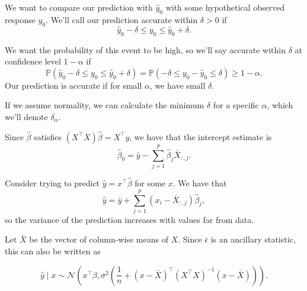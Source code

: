 \documentclass[letterpaper,11pt]{article}
\begin{document}
\begin{enumerate}
\begin{enumerate}
\begin{enumerate}
\begin{description}
        We want to compare our prediction with $\hat{y}_0$ with some
        hypothetical observed response $y_0$. We'll call our prediction
        accurate within $\delta > 0$ if
        \begin{equation*}
          \hat{y}_0 - \delta \leq y_0 \leq \hat{y}_0 + \delta.
        \end{equation*}

        We want the probability of this event to be high, so we'll say accurate
        within $\delta$ at confidence level $1 - \alpha$ if
        \begin{equation*}
          \mathbb{P}\left(\hat{y}_0 - \delta \leq y_0 \leq \hat{y}_0 + \delta\right)
          = \mathbb{P}\left(-\delta \leq y_0 - \hat{y}_0 \leq \delta\right)
          \geq 1 - \alpha.
        \end{equation*}
        Our prediction is accurate if for small $\alpha$, we have small
        $\delta$.

        If we assume normality, we can calculate the minimum $\delta$ for a
        specific $\alpha$, which we'll denote $\delta_\alpha$.

        Since $\hat{\beta}$ satisfies
        $\left(X^\intercal X\right)\hat{\beta} = X^\intercal y$, we have that
        the intercept estimate is
        \begin{equation}
          \hat{\beta}_0 = \bar{y} - \sum_{j=1}^p \hat{\beta}_j \bar{X}_{:,j}.
        \end{equation}

        Consider trying to predict $\hat{y} = x^\intercal\hat{\beta}$ for some
        $x$. We have that
        \begin{equation}
          \hat{y} = \bar{y} + \sum_{j=1}^p \left(x_i - \bar{X}_{:,j}\right)\hat{\beta}_j,
        \end{equation}
        so the variance of the prediction increases with values far from data.

        Let $\bar{X}$ be the vector of column-wise means of $X$. Since
        $\bar{\epsilon}$ is an ancillary statistic, this can also be written as

        \begin{equation}
          \hat{y} \mid x \sim \mathcal{N}\left(
            x^\intercal \beta,
            \sigma^2 \left(
              \frac{1}{n} +
              \left(x - \bar{X}\right)^\intercal
              \left(X^\intercal X\right)^{-1}
              \left(x - \bar{X}\right)
            \right)
          \right).
        \end{equation}


\end{description}
\end{enumerate}
\end{enumerate}
\end{enumerate}
\end{document}
